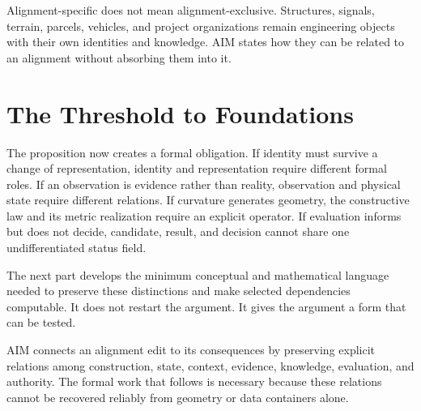 Alignment-specific does not mean alignment-exclusive. Structures, signals,
terrain, parcels, vehicles, and project organizations remain engineering
objects with their own identities and knowledge. AIM states how they can be
related to an alignment without absorbing them into it.

\section{The Threshold to Foundations}

The proposition now creates a formal obligation. If identity must survive a
change of representation, identity and representation require different
formal roles. If an observation is evidence rather than reality, observation
and physical state require different relations. If curvature generates
geometry, the constructive law and its metric realization require an explicit
operator. If evaluation informs but does not decide, candidate, result, and
decision cannot share one undifferentiated status field.

The next part develops the minimum conceptual and mathematical language needed
to preserve these distinctions and make selected dependencies computable. It
does not restart the argument. It gives the argument a form that can be tested.

\begin{summary}
AIM connects an alignment edit to its consequences by preserving explicit
relations among construction, state, context, evidence, knowledge, evaluation,
and authority. The formal work that follows is necessary because these
relations cannot be recovered reliably from geometry or data containers alone.
\end{summary}
